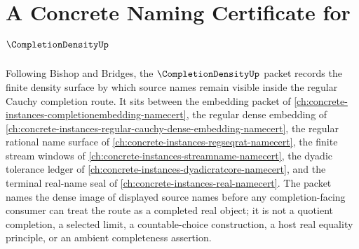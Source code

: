 \chapter{A Concrete Naming Certificate for $\CompletionDensityUp$}
\label{ch:concrete-instances-completion-density-namecert}

Following Bishop and Bridges, the $\CompletionDensityUp$ packet records the finite density surface by which source names remain visible inside the regular Cauchy completion route. It sits between the embedding packet of \autoref{ch:concrete-instances-completionembedding-namecert}, the regular dense embedding of \autoref{ch:concrete-instances-regular-cauchy-dense-embedding-namecert}, the regular rational name surface of \autoref{ch:concrete-instances-regseqrat-namecert}, the finite stream windows of \autoref{ch:concrete-instances-streamname-namecert}, the dyadic tolerance ledger of \autoref{ch:concrete-instances-dyadicratcore-namecert}, and the terminal real-name seal of \autoref{ch:concrete-instances-real-namecert}. The packet names the dense image of displayed source names before any completion-facing consumer can treat the route as a completed real object; it is not a quotient completion, a selected limit, a countable-choice construction, a host real equality principle, or an ambient completeness assertion.

